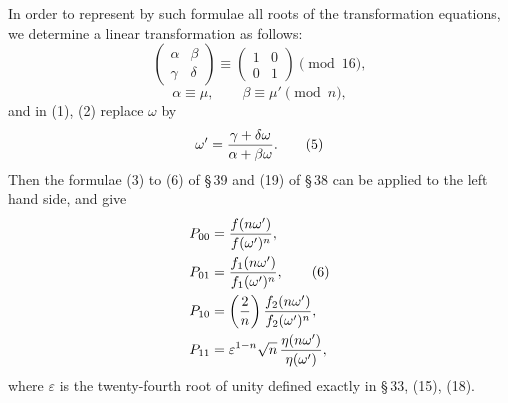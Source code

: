 \documentclass[11pt]{article}
\begin{document}
In order to represent by such formulae all roots of the transformation equations, we determine a linear transformation as follows:
\begin{equation}
\begin{pmatrix}\alpha&\beta\\ \gamma&\delta\end{pmatrix}
\equiv
\begin{pmatrix}1&0\\0&1\end{pmatrix}\pmod {16},
\tag{3}
\end{equation}
\begin{equation}
\alpha\equiv\mu,
\qquad
\beta\equiv\mu'\pmod n,
\tag{4}
\end{equation}
and in (1), (2) replace $\omega$ by
\begin{equation}
\omega'={\gamma+\delta\omega\over\alpha+\beta\omega}.
\tag{5}
\end{equation}
Then the formulae (3) to (6) of \S\,39 and (19) of \S\,38 can be applied to the left hand side, and give
\begin{align}
P_{00}&={f(n\omega')\over f(\omega')^n},\notag\\
P_{01}&={f_1(n\omega')\over f_1(\omega')^n},\tag{6}\\
P_{10}&=\left({2\over n}\right){f_2(n\omega')\over f_2(\omega')^n},\notag\\
P_{11}&=\varepsilon^{1-n}\sqrt n\,{\eta(n\omega')\over\eta(\omega')},\notag
\end{align}
where $\varepsilon$ is the twenty-fourth root of unity defined exactly in \S\,33, (15), (18).
\end{document}
